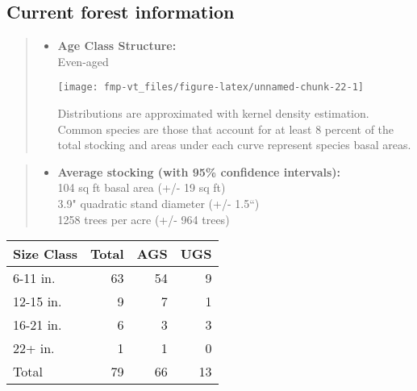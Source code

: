 \documentclass[]{tufte-handout}
\providecommand{\tightlist}{%
  \setlength{\itemsep}{0pt}\setlength{\parskip}{0pt}}
\begin{document}
\subsection{Current forest
information}\label{current-forest-information-4}

\begin{quote}
\begin{itemize}
\tightlist
\item
  \textbf{Age Class Structure:}\\
  \vspace{2pt} Even-aged\\

  \begin{marginfigure}
  \texttt{[image: fmp-vt\_files/figure-latex/unnamed-chunk-22-1]} \caption[Distributions are approximated with kernel density estimation]{Distributions are approximated with kernel density estimation. Common species are those that account for at least 8 percent of the total stocking and areas under each curve represent species basal areas.}\label{fig:unnamed-chunk-22}
  \end{marginfigure}
\end{itemize}
\end{quote}

\begin{quote}
\begin{itemize}
\tightlist
\item
  \textbf{Average stocking (with 95\% confidence intervals):}\\
  \vspace{2pt} 104 sq ft basal area (+/- 19 sq ft)\\
  3.9" quadratic stand diameter (+/- 1.5``)\\
  1258 trees per acre (+/- 964 trees)\\
  \vspace{8pt}
\end{itemize}
\end{quote}

\begin{tabular}{lrrr}
\toprule
Size Class & Total & AGS & UGS\\
\midrule
6-11 in. & 63 & 54 & 9\\
12-15 in. & 9 & 7 & 1\\
16-21 in. & 6 & 3 & 3\\
22+ in. & 1 & 1 & 0\\
Total & 79 & 66 & 13\\
\bottomrule
\end{tabular}
\end{document}

